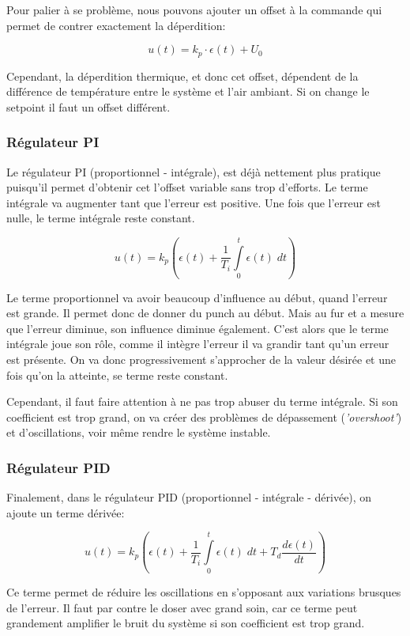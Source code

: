 Pour palier à se problème, nous pouvons ajouter un offset à la 
commande qui permet de contrer exactement la déperdition:

$$u(t) = k_p \cdot \epsilon(t) + U_0$$

Cependant, la déperdition thermique, et donc cet offset, dépendent 
de la différence de température entre le système et l'air ambiant.
Si on change le setpoint il faut un offset différent. 


\subsubsection{Régulateur PI}
Le régulateur PI (proportionnel - intégrale), est déjà nettement plus pratique
puisqu'il permet d'obtenir cet l'offset variable sans trop d'efforts. Le terme intégrale va augmenter 
tant que l'erreur est positive. Une fois que l'erreur est nulle, 
le terme intégrale reste constant. 

$$u(t) = k_p \left( \epsilon(t) + \frac{1}{T_i} \int \limits_0^t \epsilon(t) \; dt \right)$$

Le terme proportionnel va avoir beaucoup d'influence
au début, quand l'erreur est grande. Il permet donc de donner du punch au début.
Mais au fur et a mesure que l'erreur diminue, son influence diminue également.
C'est alors que le terme intégrale joue son rôle, comme il intègre l'erreur
il va grandir tant qu'un erreur est présente. On va donc progressivement
s'approcher de la valeur désirée et une fois qu'on la atteinte, se terme
reste constant.

Cependant, il faut faire attention à ne pas trop abuser du terme intégrale.
Si son coefficient est trop grand, on va créer des problèmes de dépassement
(\textit{'overshoot'}) et d'oscillations, voir même rendre le système instable.

\subsubsection{Régulateur PID}
Finalement, dans le régulateur PID (proportionnel - intégrale - dérivée), on 
ajoute un terme dérivée:

$$u(t) = k_p \left( \epsilon(t) + \frac{1}{T_i} \int \limits_0^t \epsilon(t) \; dt + T_d \frac{d\epsilon(t)}{dt} \right)$$

Ce terme permet de réduire les oscillations en s'opposant aux variations
brusques de l'erreur. Il faut par contre le doser avec grand soin, car ce
terme peut grandement amplifier le bruit du système si son coefficient est
trop grand. 


